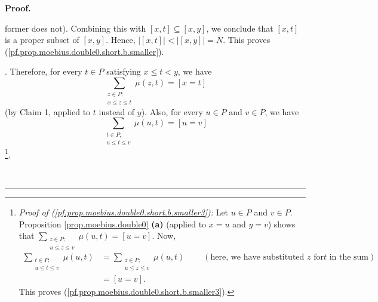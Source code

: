 \documentclass[numbers=enddot,12pt,final,onecolumn,notitlepage]{scrartcl}%
\theoremstyle{definition}
\newenvironment{proof}[1][Proof]{\noindent\textbf{#1.} }{\ \rule{0.5em}{0.5em}}
\newenvironment{vershort}{}{}
\let\sumnonlimits\sum
\renewcommand{\sum}{\sumnonlimits\limits}
\begin{document}
\begin{vershort}
\begin{proof}
{\begin{itemize}
former does not). Combining this with $\left[  x,t\right]  \subseteq\left[
x,y\right]  $, we conclude that $\left[  x,t\right]  $ is a proper subset of
$\left[  x,y\right]  $. Hence, $\left\vert \left[  x,t\right]  \right\vert
<\left\vert \left[  x,y\right]  \right\vert =N$. This proves
(\ref{pf.prop.moebius.double0.short.b.smaller}).
\end{itemize}
}. Therefore, for every $t\in P$ satisfying $x\leq t<y$, we have%
\begin{equation}
\sum_{\substack{z\in P;\\x\leq z\leq t}}\mu\left(  z,t\right)  =\left[
x=t\right]  \label{pf.prop.moebius.double0.short.b.smaller2}%
\end{equation}
(by Claim 1, applied to $t$ instead of $y$). Also, for every $u\in P$ and
$v\in P$, we have%
\begin{equation}
\sum_{\substack{t\in P;\\u\leq t\leq v}}\mu\left(  u,t\right)  =\left[
u=v\right]  \label{pf.prop.moebius.double0.short.b.smaller3}%
\end{equation}
\footnote{\textit{Proof of (\ref{pf.prop.moebius.double0.short.b.smaller3}):}
Let $u\in P$ and $v\in P$. Proposition \ref{prop.moebius.double0} \textbf{(a)}
(applied to $x=u$ and $y=v$) shows that $\sum_{\substack{z\in P;\\u\leq z\leq
v}}\mu\left(  u,t\right)  =\left[  u=v\right]  $. Now,%
\begin{align*}
\sum_{\substack{t\in P;\\u\leq t\leq v}}\mu\left(  u,t\right)   &
=\sum_{\substack{z\in P;\\u\leq z\leq v}}\mu\left(  u,t\right)
\ \ \ \ \ \ \ \ \ \ \left(  \text{here, we have substituted }z\text{ for
}t\text{ in the sum}\right) \\
&  =\left[  u=v\right]  .
\end{align*}
This proves (\ref{pf.prop.moebius.double0.short.b.smaller3}).}.


\end{proof}
\end{vershort}
\end{document}
